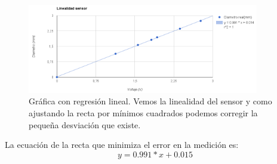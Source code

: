 \begin{figure}[H]
    \centering
    \includegraphics[width=0.9\textwidth]{images/sensor/linealidad_sensor.png}
    \caption[Gráfica con regresión lineal.]{Gráfica con regresión lineal. Vemos la linealidad del sensor y como ajustando la recta por mínimos cuadrados podemos corregir la pequeña desviación que existe.}
    \label{fig:sens_regre}
\end{figure}

La ecuación de la recta que minimiza el error en la medición es:
$$y= 0.991*x +0.015$$